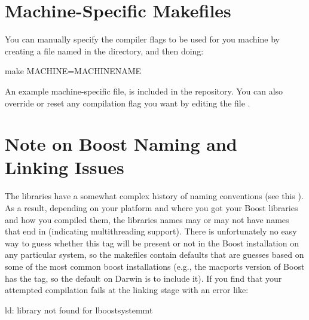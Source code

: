 \documentclass[letterpaper,10pt,english]{sphinxmanual}
\begin{document}
\section{Machine-Specific Makefiles}
\label{\detokenize{compiling:machine-specific-makefiles}}\label{\detokenize{compiling:ssec-machine-makefiles}}
You can manually specify the compiler flags to be used for you machine
by creating a file named  in the 
directory, and then doing:

\begin{sphinxVerbatim}[commandchars=\\\{\}]
make MACHINE=MACHINE\PYGZus{}NAME
\end{sphinxVerbatim}

An example machine-specific file,  is
included in the repository. You can also override or reset any
compilation flag you want by editing the file
.


\section{Note on Boost Naming and Linking Issues}
\label{\detokenize{compiling:note-on-boost-naming-and-linking-issues}}
The  libraries have a somewhat complex
history of naming conventions (see this ). As
a result, depending on your platform and where you got your Boost
libraries and how you compiled them, the libraries names may or may
not have names that end in  (indicating multithreading
support). There is unfortunately no easy way to guess whether this tag
will be present or not in the Boost installation on any particular
system, so the  makefiles contain defaults that are guesses
based on some of the most common boost installations (e.g., the
macports version of Boost has the  tag, so the default on
Darwin is to include it). If you find that your attempted compilation
fails at the linking stage with an error like:

\begin{sphinxVerbatim}[commandchars=\\\{\}]
ld: library not found for \PYGZhy{}lboost\PYGZus{}system\PYGZhy{}mt
\end{sphinxVerbatim}
\end{document}
